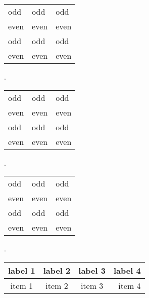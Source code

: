 \documentclass{article}
\begin{document}
\begin{center}

\begin{tabular}{lll}
odd 	& odd 	& odd \\
even 	& even 	& even\\
odd 	& odd 	& odd \\
even 	& even 	& even\\
\end{tabular}
\end{center}



{
.\newline\newline
}





\begin{center}

\begin{tabular}{lll}
odd 	& odd 	& odd \\
even 	& even 	& even\\
odd 	& odd 	& odd \\
even 	& even 	& even\\
\end{tabular}
\end{center}



{
.\newline\newline
}




\begin{center}

\begin{tabular}{lll}
odd 	& odd 	& odd \\
even 	& even 	& even\\
odd 	& odd 	& odd \\
even 	& even 	& even\\
\end{tabular}
\end{center}



{
.\newline\newline
}






\begin{tabular*}{0.75\textwidth}{ | c | c | c | r | }
  \hline
  label 1 & label 2 & label 3 & label 4 \\
  \hline 
  item 1  & item 2  & item 3  & item 4  \\
  \hline
\end{tabular*}
\end{document}
